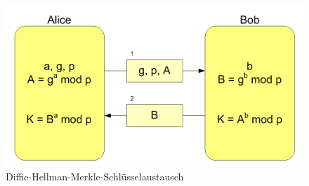\documentclass[
  a4paper,
  11pt,
]{scrartcl}
\theoremstyle{plain}
\theoremstyle{definition}
\theoremstyle{remark}
\begin{document}
\begin{figure}[H]
  \centering
  \includegraphics[width=\textwidth]{Diffie-Hellman-Schluesselaustausch2.png}
  \caption{Diffie-Hellman-Merkle-Schlüsselaustausch}
  \label{fig:dhke}
\end{figure}
\end{document}
